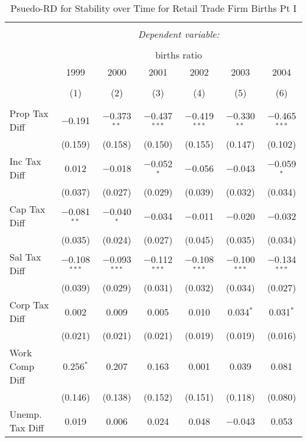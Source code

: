 
\begin{table}[!htbp] \centering 
  \caption{Psuedo-RD for Stability over Time for  Retail Trade Firm Births Pt I} 
  \label{44-45year} 
\small 
\begin{tabular}{@{\extracolsep{5pt}}lcccccc} 
\\[-1.8ex]\hline 
\hline \\[-1.8ex] 
 & \multicolumn{6}{c}{\textit{Dependent variable:}} \\ 
\cline{2-7} 
\\[-1.8ex] & \multicolumn{6}{c}{births ratio} \\ 
 & 1999 & 2000 & 2001 & 2002 & 2003 & 2004 \\ 
\\[-1.8ex] & (1) & (2) & (3) & (4) & (5) & (6)\\ 
\hline \\[-1.8ex] 
 Prop Tax Diff & $-$0.191 & $-$0.373$^{**}$ & $-$0.437$^{***}$ & $-$0.419$^{***}$ & $-$0.330$^{**}$ & $-$0.465$^{***}$ \\ 
  & (0.159) & (0.158) & (0.150) & (0.155) & (0.147) & (0.102) \\ 
  Inc Tax Diff & 0.012 & $-$0.018 & $-$0.052$^{*}$ & $-$0.056 & $-$0.043 & $-$0.059$^{*}$ \\ 
  & (0.037) & (0.027) & (0.029) & (0.039) & (0.032) & (0.034) \\ 
  Cap Tax Diff & $-$0.081$^{**}$ & $-$0.040$^{*}$ & $-$0.034 & $-$0.011 & $-$0.020 & $-$0.032 \\ 
  & (0.035) & (0.024) & (0.027) & (0.045) & (0.035) & (0.034) \\ 
  Sal Tax Diff & $-$0.108$^{***}$ & $-$0.093$^{***}$ & $-$0.112$^{***}$ & $-$0.108$^{***}$ & $-$0.100$^{***}$ & $-$0.134$^{***}$ \\ 
  & (0.039) & (0.029) & (0.031) & (0.032) & (0.034) & (0.027) \\ 
  Corp Tax Diff & 0.002 & 0.009 & 0.005 & 0.010 & 0.034$^{*}$ & 0.031$^{*}$ \\ 
  & (0.021) & (0.021) & (0.021) & (0.019) & (0.019) & (0.016) \\ 
  Work Comp Diff & 0.256$^{*}$ & 0.207 & 0.163 & 0.001 & 0.039 & 0.081 \\ 
  & (0.146) & (0.138) & (0.152) & (0.151) & (0.118) & (0.080) \\ 
  Unemp. Tax Diff & 0.019 & 0.006 & 0.024 & 0.048 & $-$0.043 & 0.053 \\ 

\end{tabular}
\end{table}
